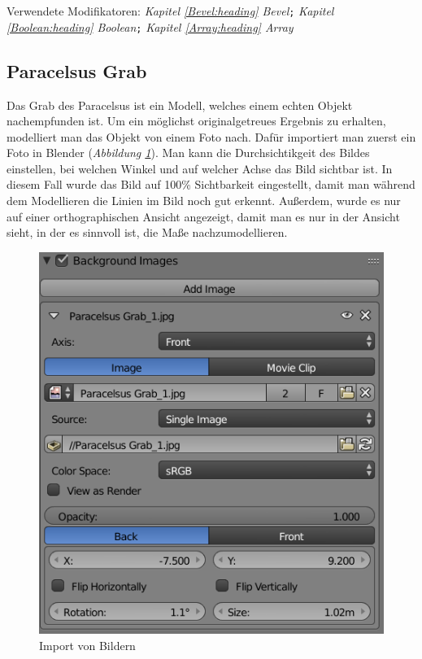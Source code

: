 Verwendete Modifikatoren: \textit{Kapitel \ref{Bevel:heading} \dq Bevel\dq}\verb+;+ \textit{Kapitel \ref{Boolean:heading} \dq Boolean\dq}\verb+;+ \textit{Kapitel \ref{Array:heading} \dq Array\dq}

\subsection{Paracelsus Grab}
\label{paracelsusgrab:ref1}
Das Grab des Paracelsus ist ein Modell, welches einem echten Objekt nachempfunden ist. Um ein möglichst originalgetreues Ergebnis zu erhalten,
modelliert man das Objekt von einem Foto nach. Dafür importiert man zuerst ein Foto in Blender (\textit{Abbildung \ref{Paracelsus_Grab:image1}}).
Man kann die Durchsichtikgeit des Bildes einstellen, bei welchen Winkel und auf welcher Achse das Bild sichtbar ist.
In diesem Fall wurde das Bild auf 100\% Sichtbarkeit eingestellt, damit man während dem Modellieren die Linien im Bild noch gut erkennt.
Außerdem, wurde es nur auf einer orthographischen Ansicht angezeigt, damit man es nur in der Ansicht sieht, in der es sinnvoll ist, die Maße nachzumodellieren.

\raggedbottom
\begin{figure}[H]
    \centering
    \includegraphics[width=.8\textwidth]{images/Paracelsus-Grab_Import-von-Bildern.png}
    \caption{Import von Bildern}
    \label{Paracelsus_Grab:image1}
\end{figure}

